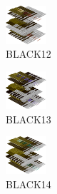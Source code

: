\hspace{0.1cm}
\begin{minipage}[b]{0.15\linewidth}
\begin{figure}[H]                                                          
  \centering                                                             
  \begin{adjustbox}{width=1.5cm,center}                                   
  \includegraphics[width=1.5cm]{src/colorspace_colourflow/flows/colourflow_12-45.png}%
  \end{adjustbox}                                                        
\caption*{BLACK12}                                           
\end{figure}                                                               
\end{minipage}
\hspace{0.1cm}
\begin{minipage}[b]{0.15\linewidth}
\begin{figure}[H]                                                          
  \centering                                                             
  \begin{adjustbox}{width=1.5cm,center}                                   
  \includegraphics[width=1.5cm]{src/colorspace_colourflow/flows/colourflow_13-45.png}%
  \end{adjustbox}                                                        
\caption*{BLACK13}                                           
\end{figure}                                                               
\end{minipage}
\hspace{0.1cm}
\begin{minipage}[b]{0.15\linewidth}
\begin{figure}[H]                                                          
  \centering                                                             
  \begin{adjustbox}{width=1.5cm,center}                                   
  \includegraphics[width=1.5cm]{src/colorspace_colourflow/flows/colourflow_14-45.png}%
  \end{adjustbox}                                                        
\caption*{BLACK14}                                           
\end{figure}                                                               
\end{minipage}
